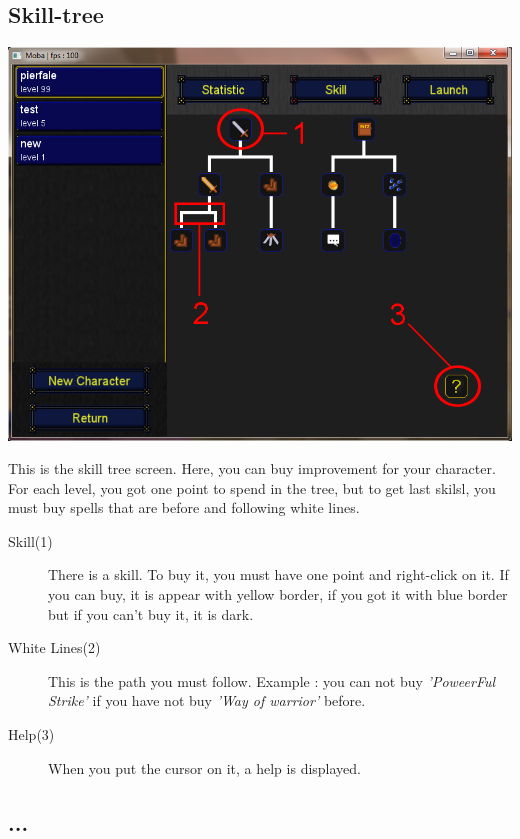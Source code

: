 \documentclass{scrreprt}
\begin{document}
		  \subsection{Skill-tree}
		  \begin{center}
		  \includegraphics[scale=0.4]{skill_tree_screen.png}
		  \end{center}
		  This is the skill tree screen. Here, you can buy improvement for your character. For each level, you got one point to spend in the tree, but to get last skilsl, you must buy spells that are before and following white lines.
		  \begin{description}
		  \item[Skill(1)]{There is a skill. To buy it, you must have one point and right-click on it. If you can buy, it is appear with yellow border, if you got it with blue border but if you can't buy it, it is dark.}
		  \item[White Lines(2)]{This is the path you must follow. Example : you can not buy \emph{'PoweerFul Strike'} if you have not buy \emph{'Way of warrior'} before.}
		  \item[Help(3)]{When you put the cursor on it, a help is displayed.}
		  \end{description}
		  \subsection{...}
\end{document}
